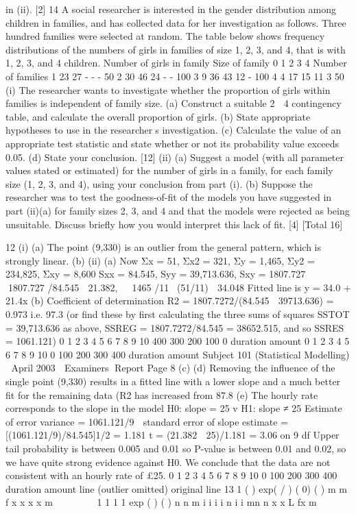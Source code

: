 in (ii). [2]
14 A social researcher is interested in the gender distribution among children in families,
and has collected data for her investigation as follows.
Three hundred families were selected at random. The table below shows frequency
distributions of the numbers of girls in families of size 1, 2, 3, and 4, that is with 1, 2,
3, and 4 children.
Number of girls in family
Size of
family 0 1 2 3 4
Number of
families
1 23 27 - - - 50
2 30 46 24 - - 100
3 9 36 43 12 - 100
4 4 17 15 11 3 50
(i) The researcher wants to investigate whether the proportion of girls within
families is independent of family size.
(a) Construct a suitable 2  4 contingency table, and calculate the overall
proportion of girls.
(b) State appropriate hypotheses to use in the researchers investigation.
(c) Calculate the value of an appropriate test statistic and state whether or
not its probability value exceeds 0.05.
(d) State your conclusion. [12]
(ii) (a) Suggest a model (with all parameter values stated or estimated) for the
number of girls in a family, for each family size (1, 2, 3, and 4), using
your conclusion from part (i).
(b) Suppose the researcher was to test the goodness-of-fit of the models
you have suggested in part (ii)(a) for family sizes 2, 3, and 4 and that
the models were rejected as being unsuitable. Discuss briefly how you
would interpret this lack of fit. [4]
[Total 16]


12 (i) (a)
The point (9,330) is an outlier from the general pattern, which is
strongly linear.
(b)
(ii) (a) Now Σx = 51, Σx2 = 321, Σy = 1,465, Σy2 = 234,825, Σxy = 8,600
Sxx = 84.545, Syy = 39,713.636, Sxy = 1807.727
  1807.727 /84.545  21.382,  1465 /11(51/11)  34.048
Fitted line is y = 34.0 + 21.4x
(b) Coefficient of determination R2 = 1807.7272/(84.545  39713.636)
= 0.973 i.e. 97.3%
(or find these by first calculating the three sums of squares SSTOT
= 39,713.636 as above, SSREG = 1807.7272/84.545 = 38652.515, and
so SSRES = 1061.121)
0 1 2 3 4 5 6 7 8 9 10
400
300
200
100
0
duration
amount
0 1 2 3 4 5 6 7 8 9 10
0
100
200
300
400
duration
amount
Subject 101 (Statistical Modelling)  April 2003  Examiners Report
Page 8
(c)
(d) Removing the influence of the single point (9,330) results in a fitted
line with a lower slope and a much better fit for the remaining data (R2
has increased from 87.8%
(e) The hourly rate corresponds to the slope in the model
H0: slope = 25 v H1: slope ≠ 25
Estimate of error variance = 1061.121/9
 standard error of slope estimate = [(1061.121/9)/84.545]1/2 = 1.181
t = (21.382  25)/1.181 = 	3.06 on 9 df
Upper tail probability is between 0.005 and 0.01 so P-value is between
0.01 and 0.02, so we have quite strong evidence against H0. We
conclude that the data are not consistent with an hourly rate of £25.
0 1 2 3 4 5 6 7 8 9 10
0
100
200
300
400
duration
amount
line (outlier omitted)
original line
13
1 ( ) exp( / ) ( 0)
( )
m
m
f x x x x
m
  
 
 
1 1
1
1
exp
( )
( )
n n m i i
i i n
i i mn n
x x
L fx
m
 


  
 
  	 
 

